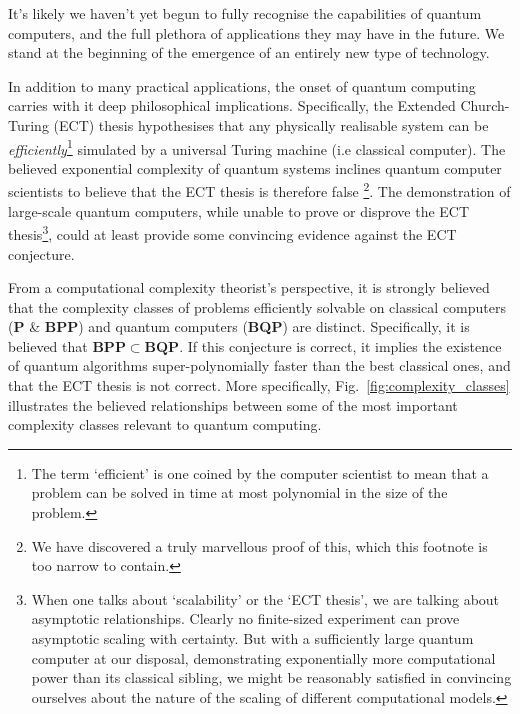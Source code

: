 It's likely we haven't yet begun to fully recognise the capabilities of quantum computers, and the full plethora of applications they may have in the future. We stand at the beginning of the emergence of an entirely new type of technology.

In addition to many practical applications, the onset of quantum computing carries with it deep philosophical implications. Specifically, the Extended Church-Turing (ECT) thesis hypothesises that any physically realisable system can be \textit{efficiently}\footnote{The term `efficient' is one coined by the computer scientist to mean that a problem can be solved in time at most polynomial in the size of the problem.} simulated by a universal Turing machine (i.e classical computer). The believed exponential complexity of quantum systems inclines quantum computer scientists to believe that the ECT thesis is therefore false \cite{bib:Deutsch85}\footnote{We have discovered a truly marvellous proof of this, which this footnote is too narrow to contain.}. The demonstration of large-scale quantum computers, while unable to prove or disprove the ECT thesis\footnote{When one talks about `scalability' or the `ECT thesis', we are talking about asymptotic relationships. Clearly no finite-sized experiment can prove asymptotic scaling with certainty. But with a sufficiently large quantum computer at our disposal, demonstrating exponentially more computational power than its classical sibling, we might be reasonably satisfied in convincing ourselves about the nature of the scaling of different computational models.}, could at least provide some convincing evidence against the ECT conjecture.

From a computational complexity theorist's perspective, it is strongly believed that the complexity classes of problems efficiently solvable on classical computers (\textbf{P} \& \textbf{BPP}) and quantum computers (\textbf{BQP}) are distinct. Specifically, it is believed that \mbox{$\mathbf{BPP}\subset\mathbf{BQP}$}. If this conjecture is correct, it implies the existence of quantum algorithms super-polynomially faster than the best classical ones, and that the ECT thesis is not correct. More specifically, Fig.~\ref{fig:complexity_classes} illustrates the believed relationships between some of the most important complexity classes relevant to quantum computing.

